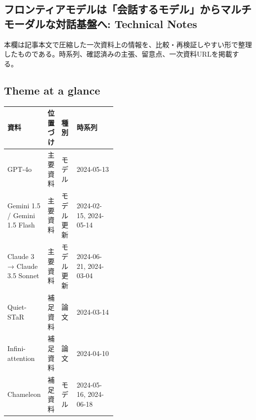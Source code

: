 \subsection*{フロンティアモデルは「会話するモデル」からマルチモーダルな対話基盤へ: Technical Notes}
本欄は記事本文で圧縮した一次資料上の情報を、比較・再検証しやすい形で整理したものである。時系列、確認済みの主張、留意点、一次資料URLを掲載する。
\medskip
\subsection*{Theme at a glance}
\begin{center}
\footnotesize
\begin{tabularx}{\linewidth}{@{}p{0.20\linewidth}p{0.10\linewidth}p{0.14\linewidth}X@{}}
\toprule
資料 & 位置づけ & 種別 & 時系列 \\
\midrule
GPT-4o & 主要資料 & モデル & 2024-05-13   \\
Gemini 1.5 / Gemini 1.5 Flash & 主要資料 & モデル更新 & 2024-02-15, 2024-05-14   \\
Claude 3 → Claude 3.5 Sonnet & 主要資料 & モデル更新 & 2024-06-21, 2024-03-04   \\
Quiet-STaR & 補足資料 & 論文 & 2024-03-14   \\
Infini-attention & 補足資料 & 論文 & 2024-04-10   \\
Chameleon & 補足資料 & モデル & 2024-05-16, 2024-06-18   \\
\bottomrule
\end{tabularx}
\end{center}
\normalsize

